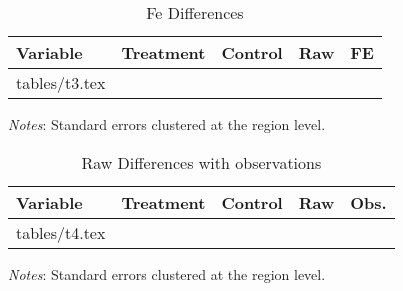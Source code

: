 \documentclass[a4paper]{article}
\makeatletter
\newcommand\primitiveinput[1]
{\@@input #1 }
\makeatother
\begin{document}
\begin{table}[H]
    \singlespacing
    \small
    \centering 
    \begin{adjustbox}{max width=\textwidth}
      \begin{threeparttable}
        \caption{Fe Differences}
        \label{tab:table3}
        \begin{tabular}[t]{@{}lcccc}
            \toprule
            Variable & Treatment & Control & Raw & FE  \\
            \midrule 
            \addlinespace
            \primitiveinput{tables/t3.tex}
            \bottomrule
        \end{tabular}
        \begin{tablenotes}
            \setlength{}
            \footnotesize
            \item \textit{Notes}: Standard errors clustered at the region level.
        \end{tablenotes}
      \end{threeparttable}
   \end{adjustbox}
 \end{table}
\begin{table}[H]
  \singlespacing
  \small
  \centering 
  \begin{adjustbox}{max width=\textwidth}
    \begin{threeparttable}
      \caption{Raw Differences with observations}
      \label{tab:table4}
      \begin{tabular}[t]{@{}lcccc}
          \toprule
          Variable & Treatment & Control & Raw & Obs.  \\
          \midrule 
          \addlinespace
          \primitiveinput{tables/t4.tex}
          \bottomrule
      \end{tabular}
      \begin{tablenotes}
          \setlength{}
          \footnotesize
          \item \textit{Notes}: Standard errors clustered at the region level.
      \end{tablenotes}
    \end{threeparttable}
 \end{adjustbox}
\end{table}

\end{document}
